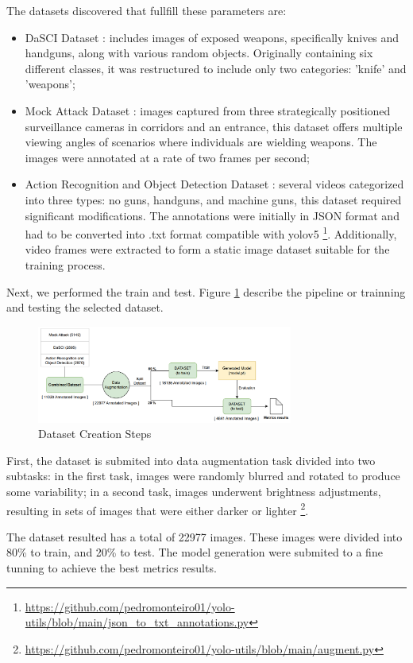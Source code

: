 The datasets discovered that fullfill these parameters are:

\begin{itemize}
    \item DaSCI Dataset \cite{rfc29}: includes images of exposed weapons, specifically knives and handguns, along with various 
    random objects. Originally containing six different classes, it was restructured to include only two categories: 
    'knife' and 'weapons';
    \item Mock Attack Dataset \cite{rfc45}: images captured from three strategically positioned surveillance cameras in corridors 
    and an entrance, this dataset offers multiple viewing angles of scenarios where individuals are wielding weapons. 
    The images were annotated at a rate of two frames per second;
    \item Action Recognition and Object Detection Dataset \cite{rfc52}: several videos categorized into three types: no guns, handguns, 
    and machine guns, this dataset required significant modifications. The annotations were initially in JSON 
    format and had to be converted into .txt format compatible with \ac{yolo}v5 \footnote{\url{https://github.com/pedromonteiro01/yolo-utils/blob/main/json\_to\_txt\_annotations.py}}. Additionally, video frames were extracted 
    to form a static image dataset suitable for the training process.
\end{itemize}

Next, we performed the train and test. Figure \ref{fig:dataset-mq} describe the pipeline or trainning  and testing the selected dataset. 

\begin{figure}[h]
    \centering 
    \includegraphics[width=0.75\textwidth]{figs/dataset-creation3.png} 
    \caption{Dataset Creation Steps}
    \label{fig:dataset-mq}
\end{figure}


First, the dataset is submited into data augmentation task divided into two subtasks: in the first task, images were 
randomly blurred and rotated to produce some variability; in a second task, images underwent brightness adjustments,
resulting in sets of images that were either darker or lighter \footnote{\url{https://github.com/pedromonteiro01/yolo-utils/blob/main/augment.py}}.

The dataset resulted has a total of 22977 images. These images were divided into 
80\% to train, and 20\% to test. The model generation were submited to a fine tunning to achieve the best metrics results.
